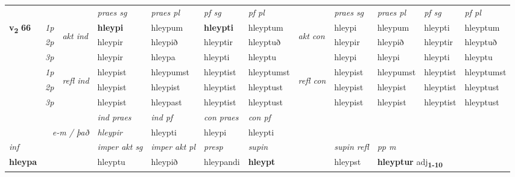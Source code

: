 \begin{longtable}[l]{X>{\footnotesize\itshape}llXXXXlXXXX}
 & &   & \textit{praes sg}  & \textit{praes pl}    & \textit{ pf sg} & \textit{pf pl} & & \textit{praes sg}  & \textit{praes pl}    & \textit{pf sg} & \textit{pf pl }  \\ \cmidrule{4-7} \cmidrule{9-12}
 \multirow{2}{*}{{{\textbf{v{\textsubscript{2}}} \Large{\textbf{66}}}}}  & 1p & \multirow{3}{*}{\begin{turn}{90}\textit{akt ind}\end{turn}} & \textbf{hleypi} & hleypum & \textbf{hleypti} & hleyptum & \multirow{3}{*}{\begin{turn}{90}\textit{akt con}\end{turn}} &hleypi & hleypum & hleypti & hleyptum\\*
 & 2p &  &  hleypir  & hleypið & hleyptir & hleyptuð & & hleypir & hleypið & hleyptir & hleyptuð \\*
 & 3p &  & hleypir & hleypa & hleypti & hleyptu & & hleypi & hleypi& hleypti & hleyptu \\*
\cmidrule{4-7} \cmidrule{9-12}
 & 1p & \multirow{3}{*}{\begin{turn}{90}\textit{refl ind}\end{turn}}  & hleypist & hleypumst & hleyptist & hleyptumst & \multirow{3}{*}{\begin{turn}{90}\textit{refl con}\end{turn}}  &hleypist & hleypumst & hleyptist & hleyptumst \\*
 & 2p &  & hleypist & hleypist & hleyptist & hleyptust & &hleypist & hleypist & hleyptist & hleyptust \\*
 & 3p  & & hleypist & hleypast & hleyptist & hleyptust & & hleypist & hleypist& hleyptist & hleyptust \\*
\cmidrule{4-7} \cmidrule{9-12}

   && &  \textit{ind praes} & \textit{ind pf} & \textit{con praes} & \textit{con pf} \\*
\multicolumn{3}{r}{\textit{e-m / það}} & hleypir & hleypti & hleypi & hleypti \\*

\cmidrule{4-7}
   {\textit{inf}} & &  & \textit{imper akt sg} & \textit{imper akt pl}   & \textit{presp} & \textit{supin} && \textit{supin refl} & \textit{pp m} \\*
  {\textbf{hleypa}} & && hleyptu  & hleypið   & hleypandi &  \textbf{hleypt} && hleypst & \multicolumn{2}{l}{\textbf{hleyptur} adj\textbf{\textsubscript{1-10}}} \\*

\midrule


\end{longtable}
